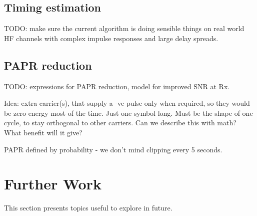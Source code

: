 \documentclass{article}
\begin{document}
{\subsection{Timing estimation}

TODO: make sure the current algorithm is doing sensible things on real world HF channels with complex impulse responses and large delay spreads.

\subsection{PAPR reduction}

TODO: expressions for PAPR reduction, model for improved SNR at Rx.

Idea: extra carrier(s), that supply a -ve pulse only when required, so they would be zero energy most of the time.  Just one symbol long.  Must be the shape of one cycle, to stay orthogonal to other carriers.  Can we describe this with math?  What benefit will it give?

PAPR defined by probability - we don't mind clipping every 5 seconds.

\section{Further Work}

This section presents topics useful to explore in future.

}
\end{document}
